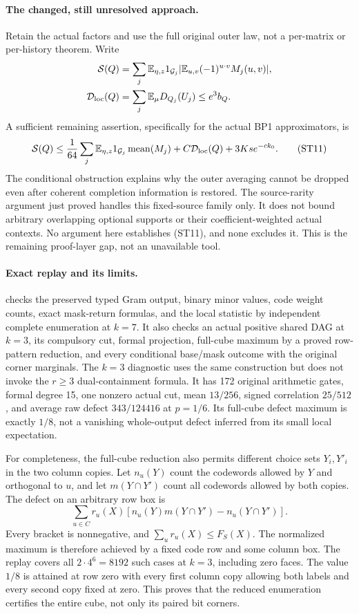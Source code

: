 \documentclass[11pt]{article}
\newcommand{\E}{\mathbb E}
\begin{document}
\paragraph{The changed, still unresolved approach.}
Retain the actual factors and use the full original outer law,
not a per-matrix or per-history theorem. Write
\[
 \begin{split}
 {\cal S}(Q)&=\sum_j\E_{\eta,z}1_{{\cal G}_j}
             |\E_{u,v}(-1)^{u\cdot v}M_j(u,v)|,\\
 {\cal D}_{\rm loc}(Q)&=\sum_j\E_\mu D_{Q_j}(U_j)\le e^3b_Q.
 \end{split}
\]
A sufficient remaining assertion, specifically for the actual
BP1 approximators, is
\[
 {\cal S}(Q)\le
 \frac1{64}\sum_j\E_{\eta,z}1_{{\cal G}_j}\operatorname{mean}(M_j)
       +C{\cal D}_{\rm loc}(Q)+3Ks e^{-ck_0}.            \tag{ST11}
\]
The conditional obstruction explains why the outer averaging cannot
be dropped even after coherent completion information is restored.
The source-rarity argument just proved handles this fixed-source
family only. It does not bound arbitrary overlapping optional
supports or their coefficient-weighted actual contexts.
No argument here establishes (ST11), and none excludes it.
This is the remaining proof-layer gap, not an unavailable tool.

\paragraph{Exact replay and its limits.}
 checks the preserved typed Gram output,
binary minor values, code weight counts, exact mask-return formulas,
and the local statistic by independent complete enumeration at $k=7$.
It also checks an actual positive shared DAG at $k=3$, its compulsory
cut, formal projection, full-cube maximum by a proved row-pattern
reduction, and every conditional base/mask outcome with the original
corner marginals. The $k=3$ diagnostic uses the same construction but
does not invoke the $r\ge3$ dual-containment formula.
It has 172 original arithmetic gates, formal degree 15, one nonzero
actual cut, mean $13/256$, signed correlation $25/512$, and
average raw defect $343/124416$ at $p=1/6$.
Its full-cube defect maximum is exactly $1/8$, not a vanishing
whole-output defect inferred from its small local expectation.

For completeness, the full-cube reduction also permits different
choice sets $Y_i,Y'_i$ in the two column copies.
Let $n_u(Y)$ count the codewords allowed by $Y$ and orthogonal to $u$,
and let $m(Y\cap Y')$ count all codewords allowed by both copies.
The defect on an arbitrary row box is
\[
 \sum_{u\in C} r_u(X)
 \left[n_u(Y)m(Y\cap Y')-n_u(Y\cap Y')\right].
\]
Every bracket is nonnegative, and $\sum_u r_u(X)\le F_S(X)$.
The normalized maximum is therefore achieved by a fixed code row
and some column box. The replay covers all $2\cdot4^6=8192$
such cases at $k=3$, including zero faces.
The value $1/8$ is attained at row zero with every first column
copy allowing both labels and every second copy fixed at zero.
This proves that the reduced enumeration certifies the entire cube,
not only its paired bit corners.
\end{document}
